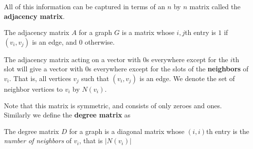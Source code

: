 \documentclass[../master.tex]{subfiles}
\begin{document}
	All of this information can be captured in terms of an $n$ by $n$ matrix called the \textbf{adjacency matrix}. 
	\begin{defn}
		The adjacency matrix $A$ for a graph $G$ is a matrix whose $i,j$th entry is $1$ if $(v_i,v_j)$ is an edge, and $0$ otherwise.
	\end{defn}
	The adjacency matrix acting on a vector with $0$s everywhere except for the $i$th slot will give a vector with $0$s everywhere except for the slots of the \textbf{neighbors} of $v_i$. That is, all vertices $v_j$ such that $(v_i, v_j)$ is an edge. We denote the set of neighbor vertices to $v_i$ by $N(v_i)$.
	
	Note that this matrix is symmetric, and consists of only zeroes and ones. Similarly we define the \textbf{degree matrix} as
	\begin{defn}
		The degree matrix $D$ for a graph is a diagonal matrix whose $(i,i)$th entry is the \emph{number of neighbors} of $v_i$, that is $|N(v_i)|$
	\end{defn}
	
\end{document}
